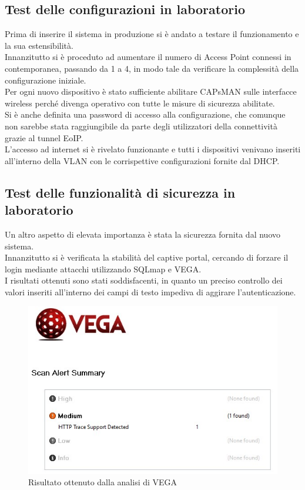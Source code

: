 \documentclass[Realizzazione.tex]{subfiles}
\begin{document}
\subsection{Test delle configurazioni in laboratorio} 
Prima di inserire il sistema in produzione si è andato a testare il funzionamento e la sua estensibilità. \\
Innanzitutto si è proceduto ad aumentare il numero di Access Point connessi in contemporanea, passando da 1 a 4, in modo tale da verificare la complessità della configurazione iniziale. \\
Per ogni nuovo dispositivo è stato sufficiente abilitare CAPsMAN sulle interfacce wireless perché divenga operativo con tutte le misure di sicurezza abilitate. \\
Si è anche definita una password di accesso alla configurazione, che comunque non sarebbe stata raggiungibile da parte degli utilizzatori della connettività grazie al tunnel EoIP. \\
L'accesso ad internet si è rivelato funzionante e tutti i dispositivi venivano inseriti all'interno della  VLAN con le corrispettive configurazioni fornite dal DHCP.

\subsection{Test delle funzionalità di sicurezza in laboratorio} 
Un altro aspetto di elevata importanza è stata la sicurezza fornita dal nuovo sistema. \\
Innanzitutto si è verificata la stabilità del captive portal, cercando di forzare il login mediante attacchi  utilizzando SQLmap e VEGA. \\
I risultati ottenuti sono stati soddisfacenti, in quanto un preciso controllo dei valori inseriti all'interno dei campi di testo impediva di aggirare l'autenticazione.
\begin{figure}[H]
	\centering
	\includegraphics[width=0.9\linewidth]{"images/vega"}
	\caption{Risultato ottenuto dalla analisi di VEGA}
	\label{fig:Risultato ottenuto dalla analisi di VEGA}
\end{figure}
\end{document}
